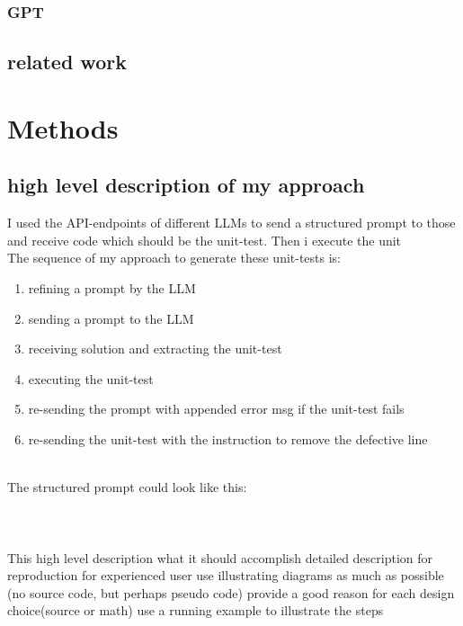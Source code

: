 \documentclass[a4paper,11pt,oneside]{memoir}
\begin{document}
\subsection{GPT}
\section{related work}

\chapter{Methods}
\section{high level description of my approach}
I used the API-endpoints of different LLMs to send a structured prompt to those and receive code which should be the unit-test. Then i execute the unit
\\The sequence of my approach to generate these unit-tests is:
\begin{enumerate}
\itemsep-1.5em
\item refining a prompt by the LLM\\
\item sending a prompt to the LLM\\
\item receiving solution and extracting the unit-test\\
\item executing the unit-test\\
\item re-sending the prompt with appended error msg if the unit-test fails\\
\item re-sending the unit-test with the instruction to remove the defective line\\
\end{enumerate}

\\The structured prompt could look like this:
\\ \noindent{}\\\\\\
This 
high level description
what it should accomplish
detailed description for reproduction for experienced user
use illustrating diagrams as much as possible
(no source code, but perhaps pseudo code)
provide a good reason for each design choice(source or math)
use a running example to illustrate the steps
\end{document}
